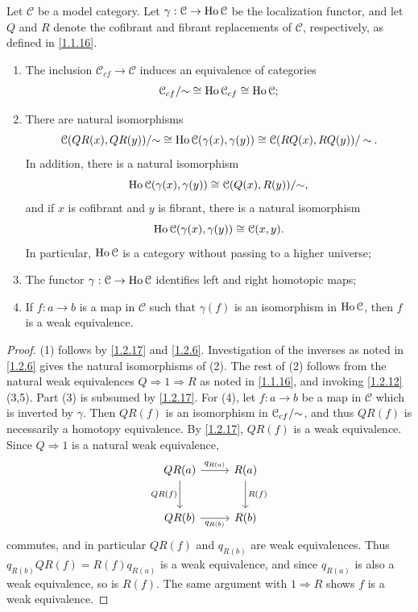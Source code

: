 \begin{theorem}\label{1.2.18}
	Let $\mathcal{C} $ be a model category. Let $\gamma : \mathcal{C}  \to \operatorname{Ho} \mathcal{C} $ be the localization functor, and let $Q$ and $R$ denote the cofibrant and fibrant replacements of $\mathcal{C} $, respectively, as defined in \cref{1.1.16}.
	\begin{enumerate}
		\item The inclusion $\mathcal{C} _{cf} \to \mathcal{C} $ induces an equivalence of categories
			\[
				\mathcal{C}_{cf} /\mathbin{\sim} \cong \operatorname{Ho} \mathcal{C} _{cf} \cong \operatorname{Ho} \mathcal{C} ;
			\]
		\item There are natural isomorphisms
			\[
				\mathcal{C} (QR(x),QR(y)) / \mathbin{\sim} \cong \operatorname{Ho} \mathcal{C} (\gamma(x),\gamma(y))\cong \mathcal{C} (RQ(x),RQ(y)) /\mathbin{\sim}
			.\]
			In addition, there is a natural isomorphism
			\[
				\operatorname{Ho} \mathcal{C} (\gamma(x),\gamma(y))\cong \mathcal{C} (Q(x),R(y)) /\mathbin{\sim},
			\]
			and if $x$ is cofibrant and $y$ is fibrant, there is a natural isomorphism
			\[
				\operatorname{Ho} \mathcal{C} (\gamma(x),\gamma(y))\cong \mathcal{C} (x,y).
			\]
			In particular, $\operatorname{Ho} \mathcal{C} $ is a category without passing to a higher universe;
		\item The functor $\gamma : \mathcal{C}  \to \operatorname{Ho} \mathcal{C} $ identifies left and right homotopic maps;
		\item If $f : a \to b$ is a map in $\mathcal{C} $ such that $\gamma(f)$ is an isomorphism in $\operatorname{Ho} \mathcal{C} $, then $f$ is a weak equivalence.
	\end{enumerate}
\end{theorem}
\begin{proof}
	(1) follows by \cref{1.2.17} and \cref{1.2.6}. Investigation of the inverses as noted in \cref{1.2.6} gives the natural isomorphisms of (2). The rest of (2) follows from the natural weak equivalences $Q\Rightarrow 1\Rightarrow R$ as noted in \cref{1.1.16}, and invoking \cref{1.2.12} (3,5). Part (3) is subsumed by \cref{1.2.17}. For (4), let $f : a \to b$ be a map in $\mathcal{C} $ which is inverted by $\gamma$. Then $QR(f)$ is an isomorphism in $\mathcal{C} _{cf} /\mathbin{\sim}$, and thus $QR(f)$ is necessarily a homotopy equivalence. By \cref{1.2.17}, $QR(f)$ is a weak equivalence. Since $Q\Rightarrow 1$ is a natural weak equivalence,
	\[\begin{tikzcd}[row sep = 2.5em, column sep = 2.5em]
	QR(a)\ar[" QR(f) "', d] \ar[" q_{R(a)}  ", r]  & R(a)\ar[" R(f) ", d]  \\
	QR(b)\ar[" q_{R(b)}  "', r]  & R(b)
	\end{tikzcd}\]
	commutes, and in particular $QR(f)$ and $q_{R(b)} $ are weak equivalences. Thus $q_{R(b)} QR(f)=R(f)q_{R(a)} $ is a weak equivalence, and since $q_{R(a)}$ is also a weak equivalence, so is $R(f)$. The same argument with $1\Rightarrow R$ shows $f$ is a weak equivalence.
\end{proof}

